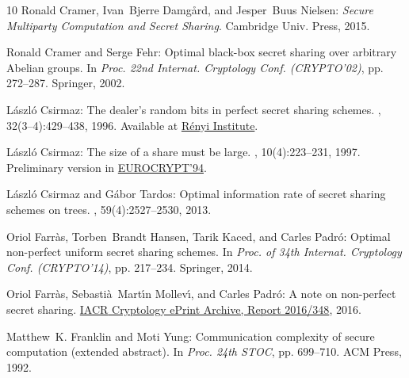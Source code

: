\documentclass[11pt]{article}
\numberwithin{equation}{section}
\theoremstyle{definition}
\theoremstyle{plain}
\begin{document}
\begin{thebibliography}{10}
{\sc Ronald Cramer, Ivan~Bjerre Damg{\aa}rd, and Jesper~Buus Nielsen}: {\em
  Secure Multiparty Computation and Secret Sharing}.
\newblock Cambridge Univ. Press, 2015.

{\sc Ronald Cramer and Serge Fehr}: Optimal black-box secret sharing over
  arbitrary {A}belian groups.
\newblock In {\em Proc. 22nd Internat. Cryptology Conf. (CRYPTO'02)}, pp.
  272--287. Springer, 2002.
\newblock [\epfmtdoi{10.1007/3-540-45708-9\_18}]

{\sc L{\'a}szl{\'o} Csirmaz}: The dealer's random bits in perfect secret
  sharing schemes.
, 32(3--4):429--438,
  1996.
\newblock Available at \href{http://www.renyi.hu/~csirmaz/secret.ps.gz}{R\'enyi
  Institute}.

{\sc L{\'{a}}szl{\'{o}} Csirmaz}: The size of a share must be large.
, 10(4):223--231, 1997.
\newblock Preliminary version in
  \href{https://doi.org/10.1007/BFb0053420}{EUROCRYPT'94}.
\newblock [\epfmtdoi{10.1007/s001459900029}]

{\sc L{\'a}szl{\'o} Csirmaz and G{\'a}bor Tardos}: Optimal information rate of
  secret sharing schemes on trees.
, 59(4):2527--2530, 2013.

{\sc Oriol Farr{\`{a}}s, Torben~Brandt Hansen, Tarik Kaced, and Carles
  Padr{\'{o}}}: Optimal non-perfect uniform secret sharing schemes.
\newblock In {\em Proc. of 34th Internat. Cryptology Conf. (CRYPTO'14)}, pp.
  217--234. Springer, 2014.
\newblock [\epfmtdoi{10.1007/978-3-662-44381-1\_13}]

{\sc Oriol Farr{\`{a}}s, Sebasti{\`{a}}~Mart{\'{\i}}n Mollev{\'{\i}}, and
  Carles Padr{\'{o}}}: A note on non-perfect secret sharing.
\newblock \href{https://eprint.iacr.org/2016/348}{{IACR} Cryptology ePrint
  Archive, Report 2016/348}, 2016.

{\sc Matthew~K. Franklin and Moti Yung}: Communication complexity of secure
  computation (extended abstract).
\newblock In {\em Proc. 24th STOC}, pp. 699--710. ACM Press, 1992.
\newblock [\epfmtdoi{10.1145/129712.129780}]


\end{thebibliography}
\end{document}
